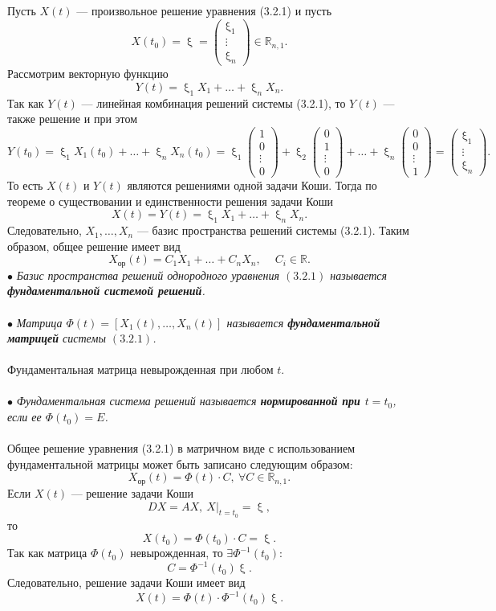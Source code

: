 \documentclass[a4paper, 12pt]{report}
\newcommand{\Rm}{\mathbb{R}}
\newcommand{\FI}{\Phi}
\renewcommand{\xi}{\upxi}
\begin{document}
Пусть $X(t)$ --- произвольное решение уравнения (3.2.1) и пусть $$X(t_0) = \xi = \begin{pmatrix}
	\xi_1 \\ \vdots \\ \xi_n
\end{pmatrix} \in \Rm_{n,1}.$$ Рассмотрим векторную функцию $$Y(t) = \xi_1X_1 + \ldots + \xi_nX_n.$$ Так как $Y(t)$ --- линейная комбинация решений системы (3.2.1), то $Y(t)$ --- также решение и при этом $$Y(t_0) = \xi_1X_1(t_0) + \ldots + \xi_nX_n(t_0) = \xi_1\begin{pmatrix}
1\\0\\\vdots\\0
\end{pmatrix} + \xi_2\begin{pmatrix}
0\\1\\\vdots\\0
\end{pmatrix} + \ldots + \xi_n\begin{pmatrix}
0\\0\\\vdots\\1
\end{pmatrix} = \begin{pmatrix}
\xi_1 \\ \vdots \\ \xi_n
\end{pmatrix}.$$
То есть $X(t)$ и $Y(t)$ являются решениями одной задачи Коши. Тогда по теореме о существовании и единственности решения задачи Коши $$X(t) = Y(t) = \xi_1X_1 + \ldots + \xi_nX_n.$$ Следовательно, $X_1,\ldots,X_n$ --- базис пространства решений системы (3.2.1). Таким образом, общее решение имеет вид $$X_{\text{ор}}(t) = C_1X_1 + \ldots + C_nX_n,\quad \ C_i \in \Rm.$$
$\bullet$ \textit{Базис пространства решений однородного уравнения $(3.2.1)$ называется \textbf{фундаментальной системой решений}.}\\\\
$\bullet$ \textit{Матрица $\FI(t) = [X_1(t),\ldots,X_n(t)]$ называется \textbf{фундаментальной матрицей} системы $(3.2.1)$.}\\\\
Фундаментальная матрица невырожденная при любом $t$.\\\\
$\bullet$ \textit{Фундаментальная система решений называется \textbf{нормированной при $t = t_0$}, если ее $\FI(t_0) = E$.}\\\\
Общее решение уравнения (3.2.1) в матричном виде с использованием фундаментальной матрицы может быть записано следующим образом: $$X_{\text{ор}}(t) = \FI(t)\cdot C, \ \forall C \in \Rm_{n,1}.$$
Если $X(t)$ --- решение задачи Коши $$DX = AX,\ X|_{t=t_0} = \xi,$$ то $$X(t_0) = \FI(t_0)\cdot C = \xi.$$ Так как матрица $\FI(t_0)$ невырожденная, то $\exists \FI^{-1}(t_0):$ $$C = \FI^{-1}(t_0)\xi.$$ Следовательно, решение задачи Коши имеет вид $$X(t) = \FI(t)\cdot \FI^{-1}(t_0)\xi.$$
\end{document}
